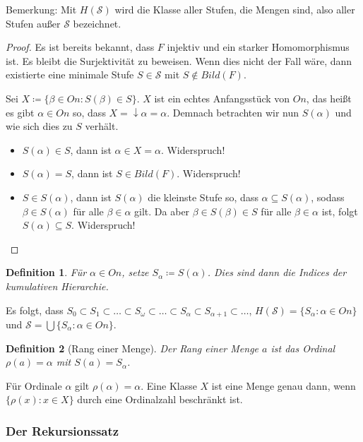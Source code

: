 \documentclass[german]{article}
\theoremstyle{break}
\theoremstyle{def_style}
\newtheorem{definition}{Definition}[section]
\theoremstyle{def_style}
\theoremstyle{lemma_style}
\begin{document}
Bemerkung: Mit $H(\mathcal{S})$ wird die Klasse aller Stufen, die Mengen sind, also aller Stufen außer $\mathcal{S}$ bezeichnet.

\begin{proof}
	Es ist bereits bekannt, dass $F$ injektiv und ein starker Homomorphismus ist. Es bleibt die Surjektivität zu beweisen. Wenn dies nicht der Fall wäre, dann existierte eine minimale Stufe $S\in\mathcal{S}$ mit $S\notin Bild(F)$. 
	
	Sei $X\coloneqq\{\beta\in On:S(\beta)\in S\}$. $X$ ist ein echtes Anfangsstück von $On$, das heißt es gibt $\alpha\in On$ so, dass $X=\downarrow \alpha=\alpha$. Demnach betrachten wir nun $S(\alpha)$ und wie sich dies zu $S$ verhält.
	\begin{itemize}
		\item $S(\alpha)\in S$, dann ist $\alpha\in X=\alpha$. Widerspruch!
		\item $S(\alpha)=S$, dann ist $S\in Bild(F)$. Widerspruch!
		\item $S\in S(\alpha)$, dann ist $S(\alpha)$ die kleinste Stufe so, dass $\alpha\subseteq S(\alpha)$, sodass $\beta\in S(\alpha)$ für alle $\beta\in\alpha$ gilt. 
		Da aber $\beta\in S(\beta)\in S$ für alle $\beta\in\alpha$ ist, folgt $S(\alpha)\subseteq S$. Widerspruch!
	\end{itemize}
\end{proof}

\begin{definition}
	Für $\alpha\in On$, setze $S_\alpha\coloneqq S(\alpha)$. Dies sind dann die \textit{Indices der kumulativen Hierarchie}.
\end{definition}

Es folgt, dass $S_0\subset S_1 \subset \dots \subset S_\omega \subset \dots \subset S_\alpha \subset S_{\alpha+1}\subset\dots$, $H(\mathcal{S})=\{S_\alpha:\alpha\in On\}$ und $\mathcal{S}=\bigcup\{S_\alpha : \alpha\in On\}$.

\begin{definition}[Rang einer Menge]
	Der \textit{Rang} einer Menge $a$ ist das Ordinal $\rho(a)=\alpha$ mit $S(a)=S_\alpha$.
\end{definition}

Für Ordinale $\alpha$ gilt $\rho(\alpha)=\alpha$. Eine Klasse $X$ ist eine Menge genau dann, wenn $\{\rho(x):x\in X\}$ durch eine Ordinalzahl beschränkt ist.

\subsubsection{Der Rekursionssatz}
\end{document}
